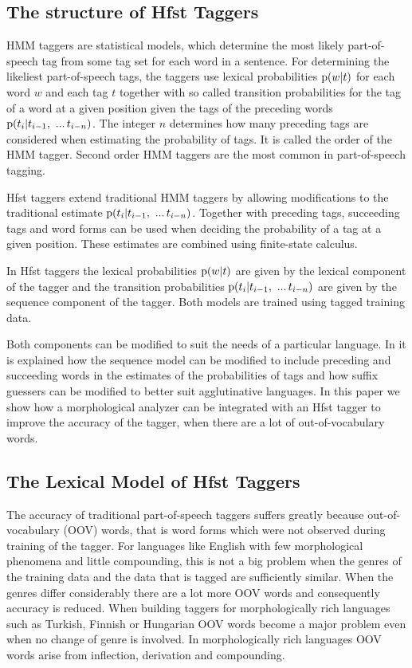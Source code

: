 \documentclass{llncs}
\begin{document}
\subsection{The structure of Hfst Taggers}

HMM taggers are statistical models, which determine the most likely
 part-of-speech tag from some tag set for each word in a sentence. For
 determining the likeliest part-of-speech tags, the taggers use
 lexical probabilities ${\rm p}(w|t)$ for each word $w$ and each tag
 $t$ together with so called transition probabilities for the tag of a
 word at a given position given the tags of the preceding words ${\rm
 p}(t_i | t_{i - 1},\ ...\, t_{i-n})$. The integer $n$ determines how
 many preceding tags are considered when estimating the probability of
 tags. It is called the order of the HMM tagger. Second order HMM
 taggers are the most common in part-of-speech tagging.

Hfst taggers extend traditional HMM taggers by allowing modifications
 to the traditional estimate ${\rm p}(t_i | t_{i - 1},\ ...\,
 t_{i-n})$. Together with preceding tags, succeeding tags and word
 forms can be used when deciding the probability of a tag at a given
 position. These estimates are combined using finite-state calculus.

In Hfst taggers the lexical probabilities ${\rm p}(w|t)$ are given by
 the lexical component of the tagger and the transition probabilities
 ${\rm p}(t_i | t_{i - 1},\ ...\, t_{i-n})$ are given by the sequence
 component of the tagger. Both models are trained using tagged
 training data.

Both components can be modified to suit the needs of a particular
 language. In \cite{Silfverberg/2011} it is explained how the sequence
 model can be modified to include preceding and succeeding words in
 the estimates of the probabilities of tags and how suffix guessers
 can be modified to better suit agglutinative languages. In this paper
 we show how a morphological analyzer can be integrated with an Hfst
 tagger to improve the accuracy of the tagger, when there are a lot of
 out-of-vocabulary words.


\subsection{The Lexical Model of Hfst Taggers}

The accuracy of traditional part-of-speech taggers suffers greatly
 because out-of-vocabulary (OOV) words, that is word forms which were
 not observed during training of the tagger. For languages like
 English with few morphological phenomena and little compounding, this
 is not a big problem when the genres of the training data and the data
 that is tagged are sufficiently similar. When the genres differ
 considerably there are a lot more OOV words and consequently accuracy
 is reduced. When building taggers for morphologically rich languages
 such as Turkish, Finnish or Hungarian OOV words become a major
 problem even when no change of genre is involved. In morphologically
 rich languages OOV words arise from inflection, derivation and
 compounding.
 
\end{document}
